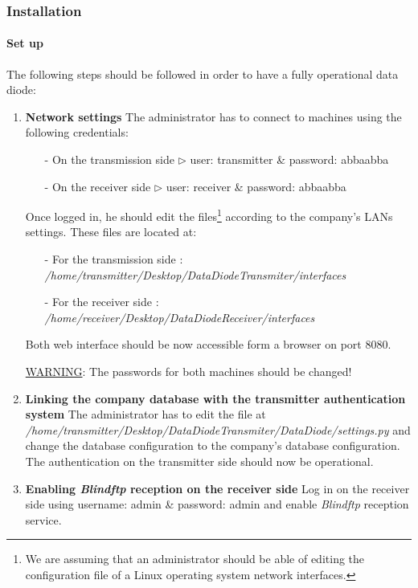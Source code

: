 \documentclass[a4paper,10pt]{article}
\begin{document}
\subsubsection{Installation}
\paragraph{Set up}
The following steps should be followed in order to have a fully operational data diode:


\begin{enumerate}
\item \textbf{Network settings} The administrator has to connect to machines using the following credentials:
	
\begin{enumerate}
\item[-]On the transmission side $\triangleright$ user: transmitter \& password: abbaabba
\item[-]On the receiver side $\triangleright$ user: receiver \& password: abbaabba
\end{enumerate}
 
Once logged in, he should edit the files\footnote{We are assuming that an administrator should be able of editing the configuration file of a Linux operating system network interfaces.} according to the company's LANs settings. These files are located at:
\begin{enumerate}
\item[-] For the transmission side : \emph{/home/transmitter/Desktop/DataDiodeTransmiter/interfaces}
\item[-] For the receiver side : \emph{/home/receiver/Desktop/DataDiodeReceiver/interfaces}
\end{enumerate}

Both web interface should be now accessible form a browser on port 8080.

\underline{WARNING}: The passwords for both machines should be changed!

\item \textbf{Linking the company database with the transmitter authentication system} The administrator has to edit the file at \emph{/home/transmitter/Desktop/DataDiodeTransmiter/DataDiode/settings.py} and change the database configuration to the company's database configuration. The authentication on the transmitter side should now be operational.

\item \textbf{Enabling \emph{Blindftp} reception on the receiver side} Log in on the receiver side using username: admin \& password: admin and enable \emph{Blindftp} reception service.


\end{enumerate}
\end{document}
